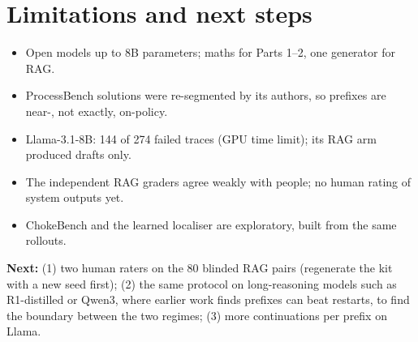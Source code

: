 \documentclass[11pt,a4paper]{article}
\begin{document}
\section{Limitations and next steps}\label{sec:limits}
\begin{itemize}
\item Open models up to 8B parameters; maths for Parts 1--2, one generator for RAG.
\item ProcessBench solutions were re-segmented by its authors, so prefixes are near-, not exactly,
on-policy.
\item Llama-3.1-8B: 144 of 274 failed traces (GPU time limit); its RAG arm produced drafts only.
\item The independent RAG graders agree weakly with people; no human rating of system outputs yet.
\item ChokeBench and the learned localiser are exploratory, built from the same rollouts.
\end{itemize}
\textbf{Next:} (1) two human raters on the 80 blinded RAG pairs (regenerate the kit with a new seed
first); (2) the same protocol on long-reasoning models such as R1-distilled or Qwen3, where earlier
work finds prefixes can beat restarts, to find the boundary between the two regimes; (3) more
continuations per prefix on Llama.

\end{document}
